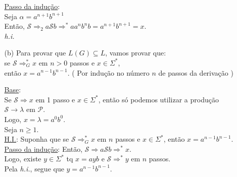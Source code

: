 \documentclass{article}
\begin{document}
\begin{enumerate}
\begin{itemize}
\begin{tabbing}
                                \> \underline{Passo da indução}: \\
                                \> Seja $ \alpha = a^{n+1}b^{n+1} $\\
                                \>  Então, $ \mathcal{S} \Rightarrow_2 a\mathcal{S}b 
                                        \Rightarrow^* aa^nb^nb = a^{n+1}b^{n+1} = x $.\\
                                \> \emph{h.i.} 
                \end{tabbing}
            \item[(b)] Para provar que $ L(G) \subseteq L $, vamos provar que:\\
                        se  $ \mathcal{S} \Rightarrow_G^* x $ em $ n > 0 $ passos e $ x \in \Sigma^* $,\\
                        então $ x = a^{n-1}b^{n-1} $. ( Por indução no número $n$ de passos da derivação )
                    \begin{tabbing}
                        \hspace{0.5cm}\= \underline{Base}:\\
                                    \> Se $ \mathcal{S} \Rightarrow x $ em 1 passo e $ x \in \Sigma^* $, então só
                                        podemos utilizar a produção $ \mathcal{S} \rightarrow \lambda $ em $\mathcal{P}.$\\
                                    \> Logo, $ x = \lambda = a^0b^0 $.\\[5pt]
                                    \> Seja $ n \geq 1 $.\\[5pt]
                                    \> \underline{H.I.}: Suponha que se $ \mathcal{S} 
                                        \Rightarrow_G^* x $ em $n$ passos e $ x \in \Sigma^* $,
                                        então $ x = a^{n-1}b^{n-1} $.\\[5pt]
                                    \> \underline{Passo da indução}: Então, $ \mathcal{S} \Rightarrow 
                                        a\mathcal{S}b \Rightarrow^* x $.\\
                                    \> Logo, existe $ y \in \Sigma^* $ tq $ x = ayb $ e $ \mathcal{S} \Rightarrow^* y $
                                        em $n$ passos.\\
                                    \> Pela \emph{h.i.}, segue que $ y = a^{n-1}b^{n-1}. $
                    \end{tabbing}
        \end{itemize}

\end{enumerate}
\end{document}
